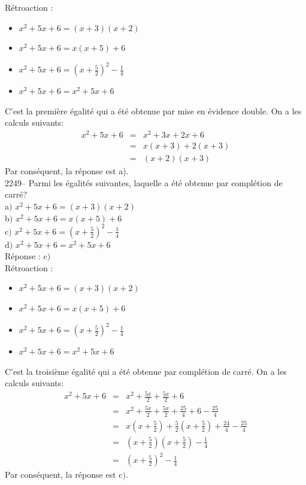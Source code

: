 \documentclass[letterpaper, 12pt]{article}
\begin{document}
R\'etroaction :\\
\begin{itemize}
 \item $x^{2}+5x+6 = (x+3)(x+2)$\\
 \item $x^{2}+5x+6 = x(x+5)+6$\\
 \item $x^{2}+5x+6 = (x+\frac{5}{2})^{2}-\frac{1}{4}$\\
 \item $x^{2}+5x+6 = x^{2}+5x+6$\\
\end{itemize}
C'est la premi\`ere \'egalit\'e qui a \'et\'e obtenue par mise en \'evidence double. On a les calculs suivants:
\begin{eqnarray*}
 x^{2}+5x+6 &=&  x^{2}+3x+2x+6\\
&=&  x(x+3)+2(x+3)\\
&=&  (x+2)(x+3)
\end{eqnarray*}
Par cons\'equent, la r\'eponse est a).\\

2249-- Parmi les \'egalit\'es suivantes, laquelle a \'et\'e obtenue par compl\'etion de carr\'e? \\

a$)$ $x^{2}+5x+6 = (x+3)(x+2)$\\[2mm]
b$)$ $x^{2}+5x+6 = x(x+5)+6$\\[2mm]
c$)$ $x^{2}+5x+6 = (x+\frac{5}{2})^{2}-\frac{1}{4}$\\[2mm]
d$)$ $x^{2}+5x+6 = x^{2}+5x+6$\\[2mm]

R\'eponse : c$)$\\

R\'etroaction :\\
\begin{itemize}
 \item $x^{2}+5x+6 = (x+3)(x+2)$\\
 \item $x^{2}+5x+6 = x(x+5)+6$\\
 \item $x^{2}+5x+6 = (x+\frac{5}{2})^{2}-\frac{1}{4}$\\
 \item $x^{2}+5x+6 = x^{2}+5x+6$\\
\end{itemize}
C'est la troisi\`eme \'egalit\'e qui a \'et\'e obtenue par compl\'etion de carr\'e. On a les calculs suivants:
\begin{eqnarray*}
 x^{2}+5x+6 &=& x^{2}+\frac{5x}{2}+\frac{5x}{2}+6\\
&=& x^{2}+\frac{5x}{2}+\frac{5x}{2}+\frac{25}{4}+6-\frac{25}{4}\\
&=& x\left(x+\frac{5}{2}\right)+\frac{5}{2}\left(x+\frac{5}{2}\right)+\frac{24}{4}-\frac{25}{4}\\
&=& \left(x+\frac{5}{2}\right)\left(x+\frac{5}{2}\right)-\frac{1}{4}\\
&=& \left(x+\frac{5}{2}\right)^{2}-\frac{1}{4}
\end{eqnarray*}
Par cons\'equent, la r\'eponse est c$)$.\\
\end{document}
